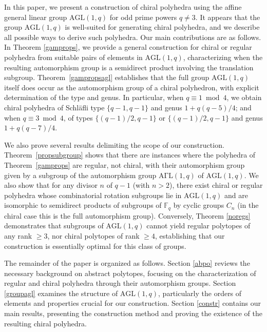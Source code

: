 \documentclass[12pt]{article}
\theoremstyle{definition}\newtheorem{definition}{Definition}[section]
\begin{document}
In this paper, we present a construction of chiral polyhedra using the affine general linear group $\mathrm{AGL}(1, q)$ for odd prime powers $q \neq 3$. It appears that the group $\mathrm{AGL}(1, q)$ is well-suited for generating chiral polyhedra, and we describe all possible ways to derive such polyhedra. Our main contributions are as follows. In Theorem \ref{gamprops}, we provide a general construction for chiral or regular polyhedra from suitable pairs of elements in $\mathrm{AGL}(1, q)$, characterizing when the resulting automorphism group is a semidirect product involving the translation subgroup. Theorem~\ref{gampropsagl} establishes that the full group $\mathrm{AGL}(1, q)$ itself does occur as the automorphism group of a chiral polyhedron, with explicit determination of the type and genus. In particular, when $q\equiv 1 \bmod{4}$, we obtain chiral polyhedra of Schl\"afli type $\{q-1, q-1\}$ and genus $1 + q(q-5)/4$; and when $q\equiv 3 \bmod{4}$, of types $\{(q-1)/2, q-1\}$ or $\{(q-1)/2, q-1\}$ and genus $1 + q(q-7)/4$.

We also prove several results delimiting the scope of our construction. Theorem~\ref{propsubgroup} shows that there are instances where the polyhedra of Theorem~\ref{gamprops} are regular, not chiral, with their automorphism group given by a subgroup of the automorphism group $\mathrm{A\Gamma L}(1, q)$ of $\mathrm{AGL}(1, q)$. We also show that for any divisor $n$ of $q-1$ (with $n > 2$), there exist chiral or regular polyhedra whose combinatorial rotation subgroups lie in $\mathrm{AGL}(1,q)$ and are isomorphic to semidirect products of subgroups of $\mathbb{F}_q$ by cyclic groups $C_n$ (in the chiral case this is the full automorphism group). Conversely, Theorem \ref{noregs} demonstrates that subgroups of $\mathrm{AGL}(1, q)$ cannot yield regular polytopes of any rank $\geq 3$, nor chiral polytopes of rank $\geq 4$, establishing that our construction is essentially optimal for this class of groups. 

The remainder of the paper is organized as follows. Section \ref{abpo} reviews the necessary background on abstract polytopes, focusing on the characterization of regular and chiral polyhedra through their automorphism groups. Section \ref{groupagl} examines the structure of $\mathrm{AGL}(1, q)$, particularly the orders of elements and properties crucial for our construction. Section \ref{constr} contains our main results, presenting the construction method and proving the existence of the resulting chiral polyhedra.
\end{document}
